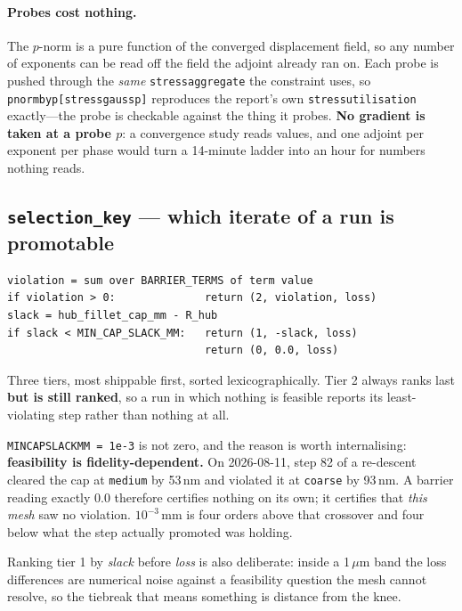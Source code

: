 \documentclass[11pt,a4paper]{article}
\DeclareRobustCommand{\code}[1]{%
  \texttt{\small\def\_{\textunderscore\discretionary{}{}{}}#1}}
\begin{document}
\paragraph{Probes cost nothing.}
The $p$-norm is a pure function of the converged displacement field, so any number of
exponents can be read off the field the adjoint already ran on. Each probe is pushed
through the \emph{same} \code{\_stress\_aggregate} the constraint uses, so
\code{pnorm\_by\_p[stress\_gauss\_p]} reproduces the report's own
\code{stress\_utilisation} exactly---the probe is checkable against the thing it probes.
\textbf{No gradient is taken at a probe $p$}: a convergence study reads values, and one
adjoint per exponent per phase would turn a 14-minute ladder into an hour for numbers
nothing reads.

\subsection{\texttt{selection\_key} --- which iterate of a run is promotable}
\label{sec:selectionkey}

\begin{lstlisting}[style=py]
violation = sum over BARRIER_TERMS of term value
if violation > 0:              return (2, violation, loss)
slack = hub_fillet_cap_mm - R_hub
if slack < MIN_CAP_SLACK_MM:   return (1, -slack, loss)
                               return (0, 0.0, loss)
\end{lstlisting}

Three tiers, most shippable first, sorted lexicographically. Tier 2 always ranks last
\textbf{but is still ranked}, so a run in which nothing is feasible reports its
least-violating step rather than nothing at all.

\code{MIN\_CAP\_SLACK\_MM = 1e-3} is not zero, and the reason is worth internalising:
\textbf{feasibility is fidelity-dependent.} On 2026-08-11, step 82 of a re-descent
cleared the cap at \code{medium} by 53\,nm and violated it at \code{coarse} by 93\,nm. A
barrier reading exactly 0.0 therefore certifies nothing on its own; it certifies that
\emph{this mesh} saw no violation. $10^{-3}$\,mm is four orders above that crossover and
four below what the step actually promoted was holding.

Ranking tier 1 by \emph{slack} before \emph{loss} is also deliberate: inside a
1\,$\mu$m band the loss differences are numerical noise against a feasibility question
the mesh cannot resolve, so the tiebreak that means something is distance from the knee.
\end{document}
